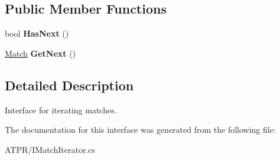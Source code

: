 \subsection*{Public Member Functions}
\begin{DoxyCompactItemize}
\item 
\hypertarget{interface_a_t_p_r_1_1_i_match_iterator_a806d473502d3d29370b2f72a3bbc3b00}{}\label{interface_a_t_p_r_1_1_i_match_iterator_a806d473502d3d29370b2f72a3bbc3b00} 
bool {\bfseries Has\+Next} ()
\item 
\hypertarget{interface_a_t_p_r_1_1_i_match_iterator_aef36e63440805a95c95d68480ba189a0}{}\label{interface_a_t_p_r_1_1_i_match_iterator_aef36e63440805a95c95d68480ba189a0} 
\hyperlink{class_a_t_p_r_1_1_match}{Match} {\bfseries Get\+Next} ()
\end{DoxyCompactItemize}


\subsection{Detailed Description}
Interface for iterating matches. 



The documentation for this interface was generated from the following file\+:\begin{DoxyCompactItemize}
\item 
A\+T\+P\+R/I\+Match\+Iterator.\+cs\end{DoxyCompactItemize}

